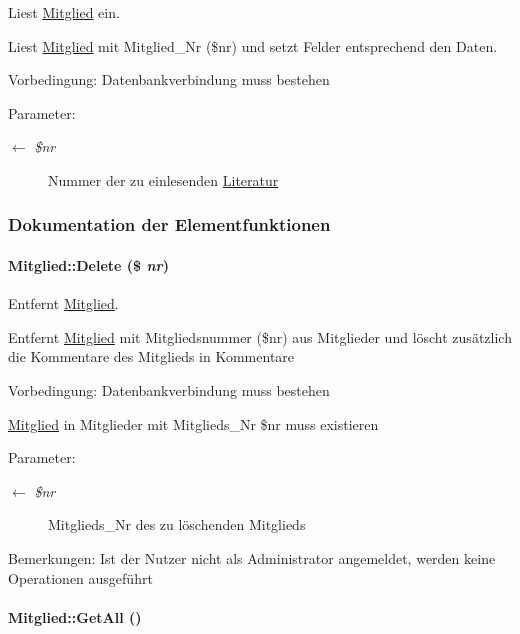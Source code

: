 Liest \hyperlink{classMitglied}{Mitglied} ein. 

Liest \hyperlink{classMitglied}{Mitglied} mit Mitglied\_\-Nr (\$nr) und setzt Felder entsprechend den Daten. \begin{Desc}
\item[Vorbedingung:]Datenbankverbindung muss bestehen \end{Desc}
\begin{Desc}
\item[Parameter:]
\begin{description}
\item[\mbox{$\leftarrow$} {\em \$nr}]Nummer der zu einlesenden \hyperlink{classLiteratur}{Literatur} \end{description}
\end{Desc}


\subsubsection{Dokumentation der Elementfunktionen}
\hypertarget{classMitglied_c6900c12663e9b228bf9942fc045b8b4}{
\paragraph[Delete]{\setlength{\rightskip}{0pt plus 5cm}Mitglied::Delete (\$ {\em nr})}\hfill}
\label{classMitglied_c6900c12663e9b228bf9942fc045b8b4}


Entfernt \hyperlink{classMitglied}{Mitglied}. 

Entfernt \hyperlink{classMitglied}{Mitglied} mit Mitgliedsnummer (\$nr) aus Mitglieder und löscht zusätzlich die Kommentare des Mitglieds in Kommentare \begin{Desc}
\item[Vorbedingung:]Datenbankverbindung muss bestehen 

\hyperlink{classMitglied}{Mitglied} in Mitglieder mit Mitglieds\_\-Nr \$nr muss existieren \end{Desc}
\begin{Desc}
\item[Parameter:]
\begin{description}
\item[\mbox{$\leftarrow$} {\em \$nr}]Mitglieds\_\-Nr des zu löschenden Mitglieds \end{description}
\end{Desc}
\begin{Desc}
\item[Bemerkungen:]Ist der Nutzer nicht als Administrator angemeldet, werden keine Operationen ausgeführt \end{Desc}
\hypertarget{classMitglied_70ce63c9c9a7159966dc9e80a7f726a2}{
\paragraph[GetAll]{\setlength{\rightskip}{0pt plus 5cm}Mitglied::Get\-All ()}\hfill}
\label{classMitglied_70ce63c9c9a7159966dc9e80a7f726a2}


